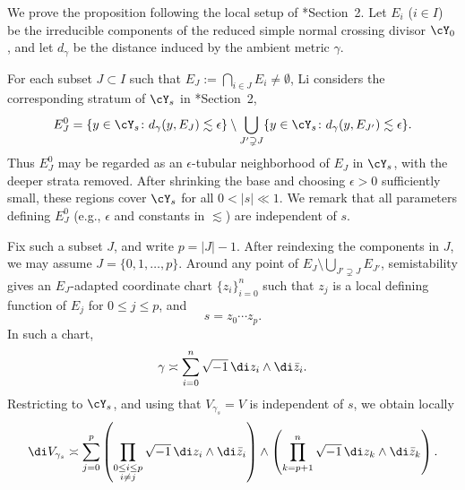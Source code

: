 \documentclass[12pt]{amsart}
\begin{document}

We prove the proposition following the local setup of \cite{Li2024}*{Section~2}.
Let $E_i$ ($i\in I$) be the irreducible components of the reduced simple
normal crossing divisor $\cY_0$, and let $d_\gamma$ be the distance induced by
the ambient \Kahler metric $\gamma$.

For each subset $J\subset I$ such that
$E_J:=\bigcap_{i\in J}E_i\neq\emptyset$, Li considers the corresponding
stratum of $\cY_s$ in \cite{Li2024}*{Section~2},
\[
E_J^0
=
\{y\in \cY_s \colon d_\gamma(y,E_J)\lesssim \epsilon\}
\setminus
\bigcup_{J'\supsetneq J}
\{y\in \cY_s \colon d_\gamma(y,E_{J'})\lesssim \epsilon\}.
\]
Thus $E_{J}^0$ may be regarded as an $\epsilon$-tubular neighborhood of
$E_J$ in $\cY_s$, with the deeper strata removed. After shrinking the
base and choosing $\epsilon>0$ sufficiently small, these regions cover
$\cY_s$ for all $0<|s|\ll1$. We remark that all parameters defining
$E^0_J$ (e.g., $\epsilon$ and constants in $\lesssim$) are independent
of $s$.

Fix such a subset $J$, and write $p=|J|-1$. After reindexing the components
in $J$, we may assume $J=\{0,1,\dots,p\}$. Around any point of
\(
E_J \setminus \bigcup_{J'\supsetneq J} E_{J'}
\), semistability gives an {$E_J$-adapted coordinate chart} 
$\{z_i\}_{i=0}^n$ such that $z_j$ is a local
defining function of $E_j$ for $0\le j\le p$, and
\[
s=z_0\cdots z_p.
\]
In such a chart,
\[
\gamma \asymp \sum_{i=0}^n \sqrt{-1}\,\di z_i\wedge \di \bar z_i.
\]
Restricting to $\cY_s$, and using that $V_{\gamma_s}=V$ is independent of
$s$, we obtain locally
\[
\di V_{\gamma_s}
\asymp
\sum_{j=0}^p
\left(
\prod_{\substack{0\le i\le p\\ i\neq j}}
\sqrt{-1}\,\di z_i\wedge \di \bar z_i
\right)
\wedge
\left(
\prod_{k=p+1}^n
\sqrt{-1}\,\di z_k\wedge \di \bar z_k
\right).
\]
\end{document}
